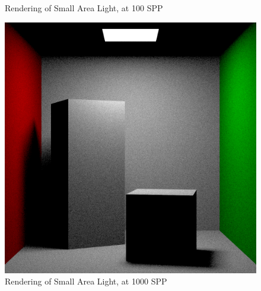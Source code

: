 \documentclass[a4paper]{myarticle}
\begin{document}
\begin{figure}[H]
\begin{minipage}[t]{.3\textwidth}
      \caption{Rendering of Small Area Light, at 100 SPP}
  \end{minipage}
  \hfill
  \begin{minipage}[t]{.3\textwidth}
      \centering
      \includegraphics[width=\textwidth]{q3/small_1_1000.png}
      \caption{Rendering of Small Area Light, at 1000 SPP}
  \end{minipage}
\end{figure}
\end{document}
